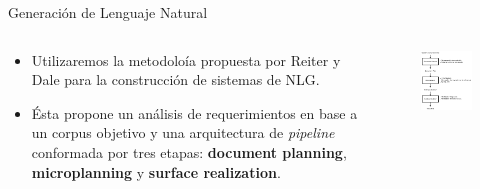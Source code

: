 \documentclass{beamer}
\begin{document}
\begin{frame}{Generación de Lenguaje Natural}{}
\begin{columns}[t] %
\begin{column}{.60\textwidth}
  \begin{itemize}
  
    \item Utilizaremos la metodoloía propuesta por Reiter y Dale para la construcción de sistemas de NLG.

    \item Ésta propone un análisis de requerimientos en base a un corpus objetivo y una arquitectura de \emph{pipeline} conformada por tres etapas: \textbf{document planning}, \textbf{microplanning} y \textbf{surface realization}.

  \end{itemize}
\end{column}%
\hfill%
\begin{column}{.40\textwidth}
  \begin{figure}[H]
    \centering
    \includegraphics[scale=0.3]{img/arquitectura.png}
  \end{figure}
\end{column}%
\end{columns}
\end{frame}
                                
\end{document}
